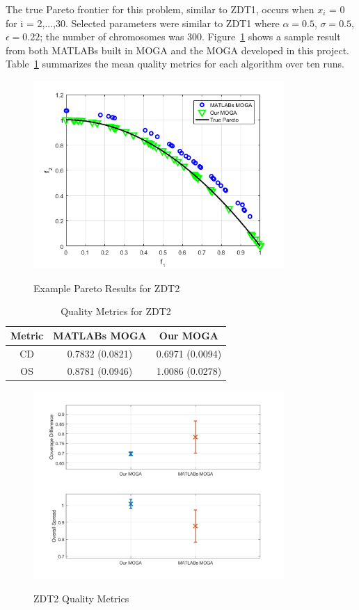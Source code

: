 \documentclass{article}
\begin{document}
\noindent The true Pareto frontier for this problem, similar to ZDT1, occurs when $x_i$ = 0 for i = 2,...,30. Selected parameters were similar to ZDT1 where $\alpha = 0.5$, $\sigma=0.5$, $\epsilon=0.22$; the number of chromosomes was 300. Figure~\ref{fig:ZDT2} shows a sample result from both MATLABs built in MOGA and the MOGA developed in this project. Table~\ref{tab:ZDT2} summarizes the mean quality metrics for each algorithm over ten runs.
\begin{figure}[H]
  \caption{Example Pareto Results for ZDT2}
  \centering
  \includegraphics[width=0.85\textwidth]{ZDT2_pareto_final.png}  
  \label{fig:ZDT2}
\end{figure}

\begin{table}[H]
\caption{Quality Metrics for ZDT2} 
\centering 
\begin{tabular}{|c|c|c|} 
\hline\hline  
Metric & MATLABs MOGA & Our MOGA \\ \hline
CD & 0.7832  (0.0821) & 0.6971  (0.0094) \\ \hline
OS &  0.8781 (0.0946) & 1.0086 (0.0278)  \\ \hline
\end{tabular}
\label{tab:ZDT2} 
\end{table}
\begin{figure}[H]
  \caption{ZDT2 Quality Metrics}
  \centering
  \includegraphics[width=0.85\textwidth]{ZDT2_QM.png}  
  \label{fig:ZDT2_QM}
\end{figure}
\newpage
\newpage
\newpage
\goodbreak
\newpage
    
\end{document}
